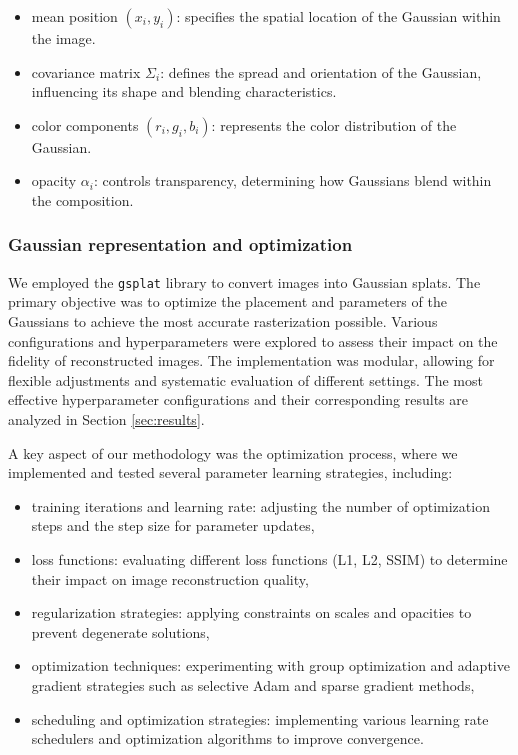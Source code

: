 \begin{itemize}
    \item mean position $(x_i, y_i)$: specifies the spatial location of the Gaussian within the image.
    \item covariance matrix $\Sigma_i$: defines the spread and orientation of the Gaussian, influencing its shape and blending characteristics.
    \item color components $(r_i, g_i, b_i)$: represents the color distribution of the Gaussian.
    \item opacity $\alpha_i$: controls transparency, determining how Gaussians blend within the composition.
\end{itemize}

\subsubsection{Gaussian representation and optimization}
We employed the \texttt{gsplat} library \cite{ye2024gsplatao} to convert images into Gaussian splats. The primary objective was to optimize the placement and parameters of the Gaussians to achieve the most accurate rasterization possible. Various configurations and hyperparameters were explored to assess their impact on the fidelity of reconstructed images. The implementation was modular, allowing for flexible adjustments and systematic evaluation of different settings. The most effective hyperparameter configurations and their corresponding results are analyzed in Section \ref{sec:results}.

A key aspect of our methodology was the optimization process, where we implemented and tested several parameter learning strategies, including:

\begin{itemize}
    \item training iterations and learning rate: adjusting the number of optimization steps and the step size for parameter updates,
    \item loss functions: evaluating different loss functions (L1, L2, SSIM) to determine their impact on image reconstruction quality,
    \item regularization strategies: applying constraints on scales and opacities to prevent degenerate solutions,
    \item optimization techniques: experimenting with group optimization and adaptive gradient strategies such as selective Adam and sparse gradient methods,
    \item scheduling and optimization strategies: implementing various learning rate schedulers and optimization algorithms to improve convergence.
\end{itemize}

